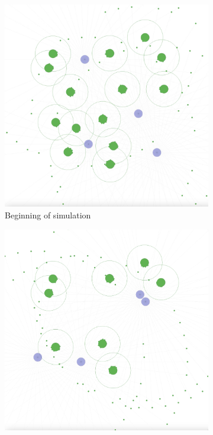 \documentclass{scrartcl}
\begin{document}
\begin{figure}
  \centering
  \begin{subfigure}[b]{0.45\textwidth}
      \centering
      \includegraphics[width=\textwidth]{img/4_agents_1.png}
      \caption{Beginning of simulation}
      \label{fig:s_mer}
  \end{subfigure}
  \hfill
  \begin{subfigure}[b]{0.45\textwidth}
      \centering
      \includegraphics[width=\textwidth]{img/4_agents_2.png}

\end{subfigure}
\end{figure}
\end{document}
